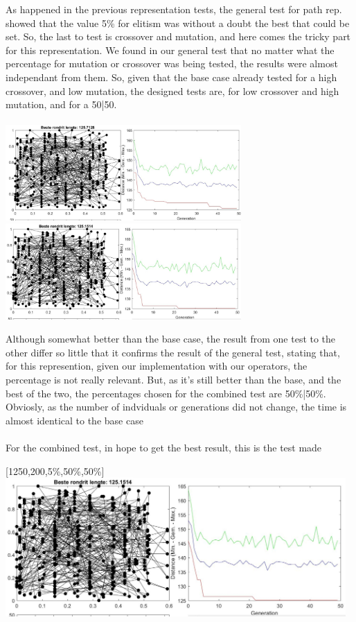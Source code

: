 As happened in the previous representation tests, the general test for path
rep. showed that the value 5\% for elitism was without a doubt the best that
could be set. So, the last to test is crossover and mutation, and here comes the tricky part for this representation. We found in our general
test that no matter what the percentage for mutation or crossover was being
tested, the results were almost independant from them. So, given that the base
case already tested for a high crossover, and low mutation, the designed
tests are, for low crossover and high mutation, and for a 50|50. \\
\text{\big[50,200,5\%,10\%,90\%\big]}
\hfill
\text{\big[50,200,5\%,50\%,50\%\big]} \\
\includegraphics[width=9cm]{img/specific/order_crossover/general_6.jpg}
\hfill
\includegraphics[width=9cm]{img/specific/order_crossover/general_7.jpg}

Although somewhat better than the base case, the result from one test to the
other differ so little that it confirms the result of the general test, stating
that, for this represention, given our implementation with our
operators, the percentage is not really relevant. But, as it's still better
than the base, and the best of the two, the percentages chosen for the combined
test are 50\%|50\%. Obviosly, as the number of indviduals or
generations did not change, the time is almost identical to the base case\\
\\
For the combined test, in hope to get the best result, this is the test made\\
\begin{center}
[1250,200,5\%,50\%,50\%]\\
\includegraphics[width=13cm]{img/specific/order_crossover/general_7.jpg}
\end{center}


